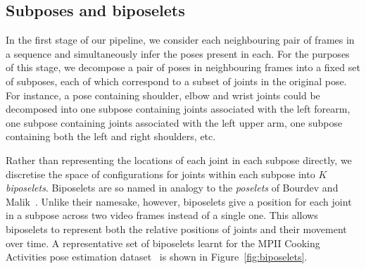 \documentclass[runningheads]{llncs}
\begin{document}

\subsection{Subposes and biposelets}

In the first stage of our pipeline, we consider each neighbouring pair of frames
in a sequence and simultaneously infer the poses present in each. For the
purposes of this stage, we decompose a pair of poses in neighbouring frames into
a fixed set of subposes, each of which correspond to a subset of joints in the
original pose. For instance, a pose containing shoulder, elbow and wrist joints
could be decomposed into one subpose containing joints associated with the left
forearm, one subpose containing joints associated with the left upper arm, one
subpose containing both the left and right shoulders, etc.

Rather than representing the locations of each joint in each subpose directly,
we discretise the space of configurations for joints within each subpose into
$K$ \textit{biposelets}. Biposelets are so named in analogy to the
\textit{poselets} of Bourdev and Malik~\cite{bourdev2009poselets}. Unlike their
namesake, however, biposelets give a position for each joint in a subpose across
two video frames instead of a single one. This allows biposelets to represent
both the relative positions of joints and their movement over time. A
representative set of biposelets learnt for the MPII Cooking Activities pose
estimation dataset~\cite{rohrbach2012database} is shown in
Figure~\ref{fig:biposelets}.
\end{document}
